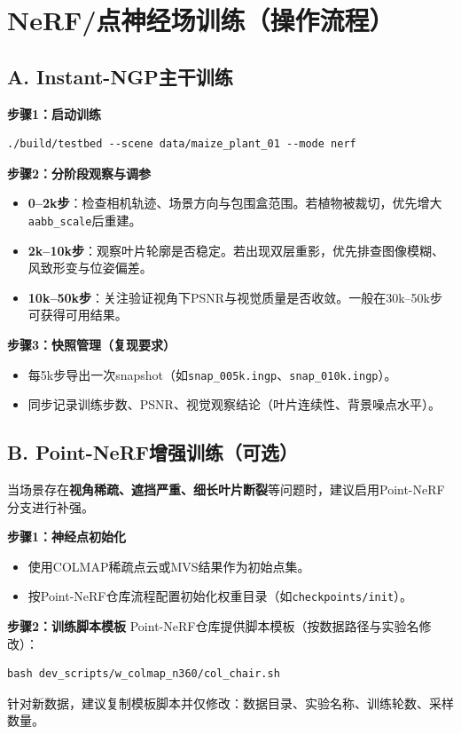 \documentclass[12pt,a4paper,fontset=fandol]{ctexart}
\begin{document}
\section{NeRF/点神经场训练（操作流程）}
\subsection{A. Instant-NGP主干训练}
\textbf{步骤1：启动训练}
\begin{verbatim}
./build/testbed --scene data/maize_plant_01 --mode nerf
\end{verbatim}

\textbf{步骤2：分阶段观察与调参}
\begin{itemize}
  \item \textbf{0--2k步}：检查相机轨迹、场景方向与包围盒范围。若植物被裁切，优先增大\texttt{aabb\_scale}后重建。
  \item \textbf{2k--10k步}：观察叶片轮廓是否稳定。若出现双层重影，优先排查图像模糊、风致形变与位姿偏差。
  \item \textbf{10k--50k步}：关注验证视角下PSNR与视觉质量是否收敛。一般在30k--50k步可获得可用结果。
\end{itemize}

\textbf{步骤3：快照管理（复现要求）}
\begin{itemize}
  \item 每5k步导出一次snapshot（如\texttt{snap\_005k.ingp}、\texttt{snap\_010k.ingp}）。
  \item 同步记录训练步数、PSNR、视觉观察结论（叶片连续性、背景噪点水平）。
\end{itemize}

\subsection{B. Point-NeRF增强训练（可选）}
当场景存在\textbf{视角稀疏、遮挡严重、细长叶片断裂}等问题时，建议启用Point-NeRF分支进行补强。

\textbf{步骤1：神经点初始化}
\begin{itemize}
  \item 使用COLMAP稀疏点云或MVS结果作为初始点集。
  \item 按Point-NeRF仓库流程配置初始化权重目录（如\texttt{checkpoints/init}）。
\end{itemize}

\textbf{步骤2：训练脚本模板}
Point-NeRF仓库提供脚本模板（按数据路径与实验名修改）：
\begin{verbatim}
bash dev_scripts/w_colmap_n360/col_chair.sh
\end{verbatim}
针对新数据，建议复制模板脚本并仅修改：数据目录、实验名称、训练轮数、采样数量。
\end{document}
